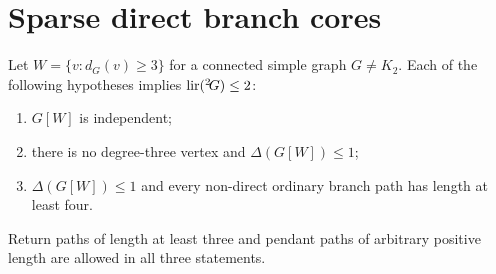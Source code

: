 \section{Sparse direct branch cores}\label{sec:branches}

\begin{theorem}[A2]\label{thm:branches}
Let $W=\{v:d_G(v)\ge3\}$ for a connected simple graph $G\ne K_2$.
Each of the following hypotheses implies $\operatorname{lir}({}^{2}\!G)\le2$:
\begin{enumerate}
\item $G[W]$ is independent;
\item there is no degree-three vertex and $\Delta(G[W])\le1$;
\item $\Delta(G[W])\le1$ and every non-direct ordinary branch path
has length at least four.
\end{enumerate}
Return paths of length at least three and pendant paths of arbitrary
positive length are allowed in all three statements.
\end{theorem}

